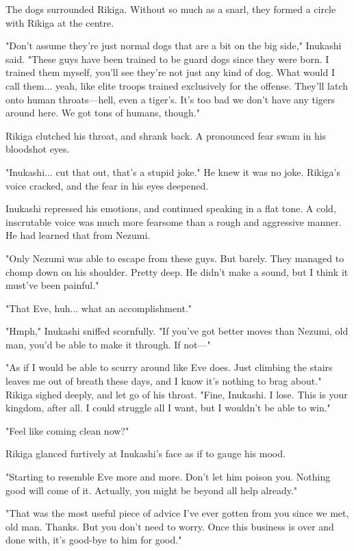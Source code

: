 The dogs surrounded Rikiga. Without so much as a snarl, they formed a
circle with Rikiga at the centre.

"Don't assume they're just normal dogs that are a bit on the big side,"
Inukashi said. "These guys have been trained to be guard dogs since they
were born. I trained them myself, you'll see they're not just any kind
of dog. What would I call them... yeah, like elite troops trained
exclusively for the offense. They'll latch onto human throats---hell, even
a tiger's. It's too bad we don't have any tigers around here. We got
tons of humans, though."

Rikiga clutched his throat, and shrank back. A pronounced fear swam in
his bloodshot eyes.

"Inukashi... cut that out, that's a stupid joke." He knew it was no
joke. Rikiga's voice cracked, and the fear in his eyes deepened.

Inukashi repressed his emotions, and continued speaking in a flat tone.
A cold, inscrutable voice was much more fearsome than a rough and
aggressive manner. He had learned that from Nezumi.

"Only Nezumi was able to escape from these guys. But barely. They
managed to chomp down on his shoulder. Pretty deep. He didn't make a
sound, but I think it must've been painful."

"That Eve, huh... what an accomplishment."

"Hmph," Inukashi sniffed scornfully. "If you've got better moves than
Nezumi, old man, you'd be able to make it through. If not---"

"As if I would be able to scurry around like Eve does. Just climbing the
stairs leaves me out of breath these days, and I know it's nothing to
brag about." Rikiga sighed deeply, and let go of his throat. "Fine,
Inukashi. I lose. This is your kingdom, after all. I could struggle all
I want, but I wouldn't be able to win."

"Feel like coming clean now?"

Rikiga glanced furtively at Inukashi's face as if to gauge his mood.

"Starting to resemble Eve more and more. Don't let him poison you.
Nothing good will come of it. Actually, you might be beyond all help
already."

"That was the most useful piece of advice I've ever gotten from you
since we met, old man. Thanks. But you don't need to worry. Once this
business is over and done with, it's good-bye to him for good."

